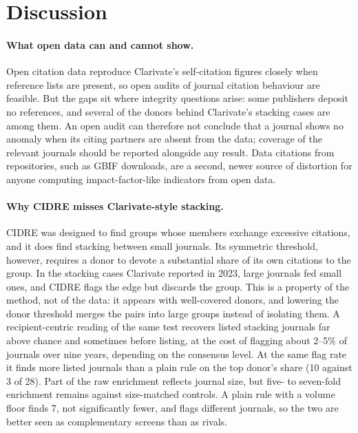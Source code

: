 \section{Discussion}\label{sec:discussion}

\paragraph{What open data can and cannot show.}
Open citation data reproduce Clarivate's self-citation figures closely when reference lists are present, so open
audits of journal citation behaviour are feasible. But the gaps sit where integrity questions arise: some publishers
deposit no references, and several of the donors behind Clarivate's stacking cases are among them. An open audit can
therefore not conclude that a journal shows no anomaly when its citing partners are absent from the data; coverage
of the relevant journals should be reported alongside any result. Data citations from repositories, such as GBIF
downloads, are a second, newer source of distortion for anyone computing impact-factor-like indicators from open
data.

\paragraph{Why CIDRE misses Clarivate-style stacking.}
CIDRE was designed to find groups whose members exchange excessive citations, and it does find stacking between small
journals. Its symmetric threshold, however, requires a donor to devote a substantial share of its own citations to the
group. In the stacking cases Clarivate reported in 2023, large journals fed small ones, and CIDRE flags the edge but
discards the group. This is a property of the method, not of the data: it appears with well-covered donors, and
lowering the donor threshold merges the pairs into large groups instead of isolating them. A recipient-centric reading
of the same test recovers listed stacking journals far above chance and sometimes before listing, at the cost of
flagging about 2--5\% of journals over nine years, depending on the consensus level. At the same flag rate it
finds more listed journals than a plain rule on the top donor's share (10 against 3 of 28). Part of the raw enrichment
reflects journal size, but five- to seven-fold enrichment remains against size-matched controls. A plain rule with a
volume floor finds 7, not significantly fewer, and flags different journals, so the two are better seen as
complementary screens than as rivals.

